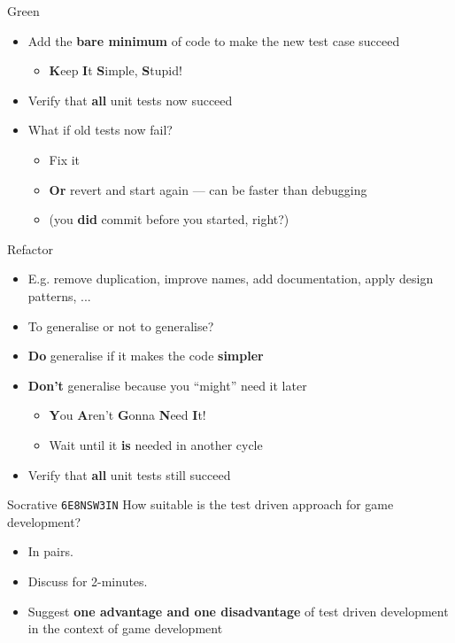 \begin{frame}{Green}
    \begin{itemize}
        \item Add the \textbf{bare minimum} of code to make the new test case succeed \pause
            \begin{itemize}
                \item \textbf{K}eep \textbf{I}t \textbf{S}imple, \textbf{S}tupid! \pause
            \end{itemize}
        \item Verify that \textbf{all} unit tests now succeed \pause
        \item What if old tests now fail? \pause
            \begin{itemize}
                \item Fix it \pause
                \item \textbf{Or} revert and start again --- can be faster than debugging \pause
                \item (you \textbf{did} commit before you started, right?)
            \end{itemize}
    \end{itemize}
\end{frame}

\begin{frame}{Refactor}
    \begin{itemize}
        \item E.g. remove duplication, improve names, add documentation, apply design patterns, ... \pause
        \item To generalise or not to generalise? \pause
        \item \textbf{Do} generalise if it makes the code \textbf{simpler} \pause
        \item \textbf{Don't} generalise because you ``might'' need it later \pause
            \begin{itemize}
                \item \textbf{Y}ou \textbf{A}ren't \textbf{G}onna \textbf{N}eed \textbf{I}t!
                \item Wait until it \textbf{is} needed in another cycle \pause
            \end{itemize}
        \item Verify that \textbf{all} unit tests still succeed
    \end{itemize}
\end{frame}

\begin{frame}{Socrative \texttt{6E8NSW3IN}}
	How suitable is the test driven approach for game development?
	\begin{itemize}
		\item In pairs.
		\item Discuss for 2-minutes.
		\item Suggest \textbf{one advantage and one disadvantage} of test driven development
            in the context of game development
	\end{itemize}
\end{frame}

